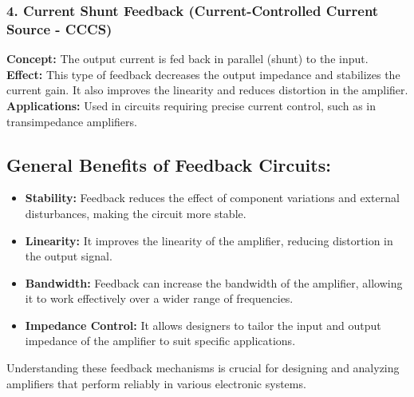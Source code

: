 \documentclass[a4paper,12pt]{report}
\begin{document}
  \subsubsection*{4. Current Shunt Feedback (Current-Controlled Current Source - CCCS)}
    \textbf{Concept:} The output current is fed back in parallel (shunt) to the input.\\
    \newline
    \textbf{Effect:} This type of feedback decreases the output impedance and stabilizes the current gain. It also improves the linearity and reduces distortion in the amplifier.\\
    \newline
    \textbf{Applications:} Used in circuits requiring precise current control, such as in transimpedance amplifiers.\\

  \subsection*{General Benefits of Feedback Circuits:}
    \begin{itemize}
        \item \textbf{Stability:} Feedback reduces the effect of component variations and external disturbances, making the circuit more stable.
        \item \textbf{Linearity:} It improves the linearity of the amplifier, reducing distortion in the output signal.
        \item \textbf{Bandwidth:} Feedback can increase the bandwidth of the amplifier, allowing it to work effectively over a wider range of frequencies.
        \item \textbf{Impedance Control:} It allows designers to tailor the input and output impedance of the amplifier to suit specific applications.
    \end{itemize}

  Understanding these feedback mechanisms is crucial for designing and analyzing amplifiers that perform reliably in various electronic systems.

  \vspace{0.3cm}
\end{document}
